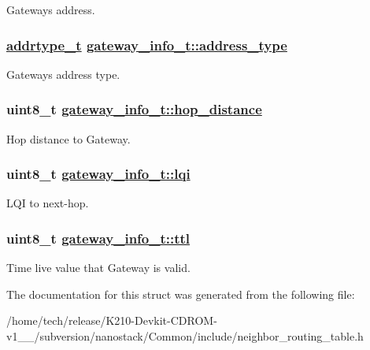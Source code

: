 Gateways address. \hypertarget{structgateway__info__t_95a861899c3eea8087b0ce133de42d80}{
\subsubsection[address\_\-type]{\setlength{\rightskip}{0pt plus 5cm}\hyperlink{address_8h_faf76b5591da0abd0584dec411d0551d}{addrtype\_\-t} \hyperlink{structgateway__info__t_95a861899c3eea8087b0ce133de42d80}{gateway\_\-info\_\-t::address\_\-type}}}
\label{structgateway__info__t_95a861899c3eea8087b0ce133de42d80}


Gateways address type. \hypertarget{structgateway__info__t_93b635756750f6abf21486d5b408e666}{
\subsubsection[hop\_\-distance]{\setlength{\rightskip}{0pt plus 5cm}uint8\_\-t \hyperlink{structgateway__info__t_93b635756750f6abf21486d5b408e666}{gateway\_\-info\_\-t::hop\_\-distance}}}
\label{structgateway__info__t_93b635756750f6abf21486d5b408e666}


Hop distance to Gateway. \hypertarget{structgateway__info__t_4075557274a491d052944514dff46f47}{
\subsubsection[lqi]{\setlength{\rightskip}{0pt plus 5cm}uint8\_\-t \hyperlink{structgateway__info__t_4075557274a491d052944514dff46f47}{gateway\_\-info\_\-t::lqi}}}
\label{structgateway__info__t_4075557274a491d052944514dff46f47}


LQI to next-hop. \hypertarget{structgateway__info__t_bf2c4546f04ee1131d3ff827921844e0}{
\subsubsection[ttl]{\setlength{\rightskip}{0pt plus 5cm}uint8\_\-t \hyperlink{structgateway__info__t_bf2c4546f04ee1131d3ff827921844e0}{gateway\_\-info\_\-t::ttl}}}
\label{structgateway__info__t_bf2c4546f04ee1131d3ff827921844e0}


Time live value that Gateway is valid. 

The documentation for this struct was generated from the following file:\begin{CompactItemize}
\item 
/home/tech/release/K210-Devkit-CDROM-v1\_\_/subversion/nanostack/Common/include/neighbor\_\-routing\_\-table.h\end{CompactItemize}
